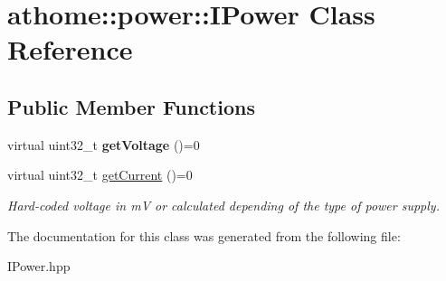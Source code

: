 \hypertarget{classathome_1_1power_1_1_i_power}{}\section{athome\+:\+:power\+:\+:I\+Power Class Reference}
\label{classathome_1_1power_1_1_i_power}
\subsection*{Public Member Functions}
\begin{DoxyCompactItemize}
\item 
\mbox{\label{classathome_1_1power_1_1_i_power_aa6a5bf366a19b1627ad8da054c9171ad}} 
virtual uint32\+\_\+t {\bfseries get\+Voltage} ()=0
\item 
\mbox{\label{classathome_1_1power_1_1_i_power_a325282edf30fe83eef09a2845478b3c9}} 
virtual uint32\+\_\+t \mbox{\hyperlink{classathome_1_1power_1_1_i_power_a325282edf30fe83eef09a2845478b3c9}{get\+Current}} ()=0
\begin{DoxyCompactList}\small\item\em Hard-\/coded voltage in mV or calculated depending of the type of power supply. \end{DoxyCompactList}\end{DoxyCompactItemize}


The documentation for this class was generated from the following file\+:\begin{DoxyCompactItemize}
\item 
I\+Power.\+hpp\end{DoxyCompactItemize}
